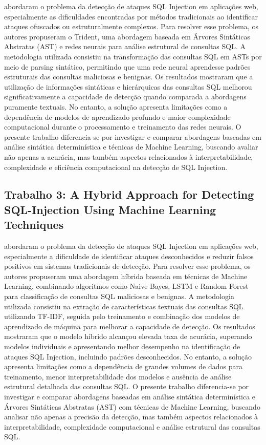 \documentclass[
    12pt,                %
    openright,           %
    oneside,             %
    a4paper,             %
    english,             %
    brazil               %
]{abntex2}
\begin{document}
 abordaram o problema da detecção de ataques SQL Injection em aplicações web, especialmente as dificuldades encontradas por métodos tradicionais ao identificar ataques ofuscados ou estruturalmente complexos. Para resolver esse problema, os autores propuseram o Trident, uma abordagem baseada em Árvores Sintáticas Abstratas (AST) e redes neurais para análise estrutural de consultas SQL. A metodologia utilizada consistiu na transformação das consultas SQL em ASTs por meio de parsing sintático, permitindo que uma rede neural aprendesse padrões estruturais das consultas maliciosas e benignas. Os resultados mostraram que a utilização de informações sintáticas e hierárquicas das consultas SQL melhorou significativamente a capacidade de detecção quando comparada a abordagens puramente textuais. No entanto, a solução apresenta limitações como a dependência de modelos de aprendizado profundo e maior complexidade computacional durante o processamento e treinamento das redes neurais. O presente trabalho diferencia-se por investigar e comparar abordagens baseadas em análise sintática determinística e técnicas de Machine Learning, buscando avaliar não apenas a acurácia, mas também aspectos relacionados à interpretabilidade, complexidade e eficiência computacional na detecção de SQL Injection.

\subsection{Trabalho 3: A Hybrid Approach for Detecting SQL-Injection Using Machine Learning Techniques}

 abordaram o problema da detecção de ataques SQL Injection em aplicações web, especialmente a dificuldade de identificar ataques desconhecidos e reduzir falsos positivos em sistemas tradicionais de detecção. Para resolver esse problema, os autores propuseram uma abordagem híbrida baseada em técnicas de Machine Learning, combinando algoritmos como Naive Bayes, LSTM e Random Forest para classificação de consultas SQL maliciosas e benignas. A metodologia utilizada consistiu na extração de características textuais das consultas SQL utilizando TF-IDF, seguida pelo treinamento e combinação dos modelos de aprendizado de máquina para melhorar a capacidade de detecção. Os resultados mostraram que o modelo híbrido alcançou elevada taxa de acurácia, superando modelos individuais e apresentando melhor desempenho na identificação de ataques SQL Injection, incluindo padrões desconhecidos. No entanto, a solução apresenta limitações como a dependência de grandes volumes de dados para treinamento, menor interpretabilidade dos modelos e ausência de análise estrutural detalhada das consultas SQL. O presente trabalho diferencia-se por investigar e comparar abordagens baseadas em análise sintática determinística e Árvores Sintáticas Abstratas (AST) com técnicas de Machine Learning, buscando analisar não apenas a precisão da detecção, mas também aspectos relacionados à interpretabilidade, complexidade computacional e análise estrutural das consultas SQL.
\end{document}
